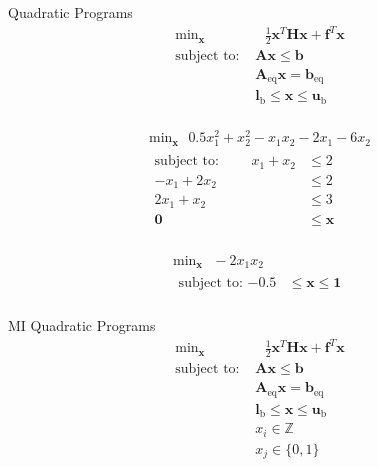 \documentclass{article}
\begin{document}
Quadratic Programs
\begin{align*}
    \text{min}_{\mathbf{x}}& \text{ } \frac{1}{2}\mathbf{x}^T \mathbf{H} \mathbf{x} + \mathbf{f}^T \mathbf{x} \\
    \mbox{subject to: }& \mathbf{A}\mathbf{x} \le \mathbf{b}\\
                       & \mathbf{A}_\text{eq}\mathbf{x} = \mathbf{b}_\text{eq}\\
                       & \mathbf{l}_{\text{b}} \le \mathbf{x} \le \mathbf{u}_{\text{b}}\\
\end{align*}

\begin{align*}
    \text{min}_{\mathbf{x}} \text{ } 0.5x_1^2 + x_2^2 - x_1x_2 - 2x_1 - 6x_2\\
    \begin{aligned}
    \mbox{subject to: } \qquad x_1 + x_2 &\le 2\\
                        -x_1 + 2x_2 &\le 2\\
                        2x_1 + x_2 &\le 3\\
                        \mathbf{0} &\le \mathbf{x}\\
    \end{aligned}
\end{align*}

\begin{align*}
    \text{min}_{\mathbf{x}} \text{ } -2x_1x_2\\
    \begin{aligned}
    \mbox{subject to: } \mathbf{-0.5} &\le \mathbf{x} \le \mathbf{1} \\
    \end{aligned}
\end{align*}


MI Quadratic Programs
\begin{align*}
    \text{min}_{\mathbf{x}}& \text{ } \frac{1}{2}\mathbf{x}^T \mathbf{H} \mathbf{x} + \mathbf{f}^T \mathbf{x} \\
    \mbox{subject to: }& \mathbf{A}\mathbf{x} \le \mathbf{b}\\
                       & \mathbf{A}_\text{eq}\mathbf{x} = \mathbf{b}_\text{eq}\\
                       & \mathbf{l}_{\text{b}} \le \mathbf{x} \le \mathbf{u}_{\text{b}}\\
                       & x_i \in \mathbb{Z}\\
                       & x_j \in \{0,1\}\\
\end{align*}
\end{document}
